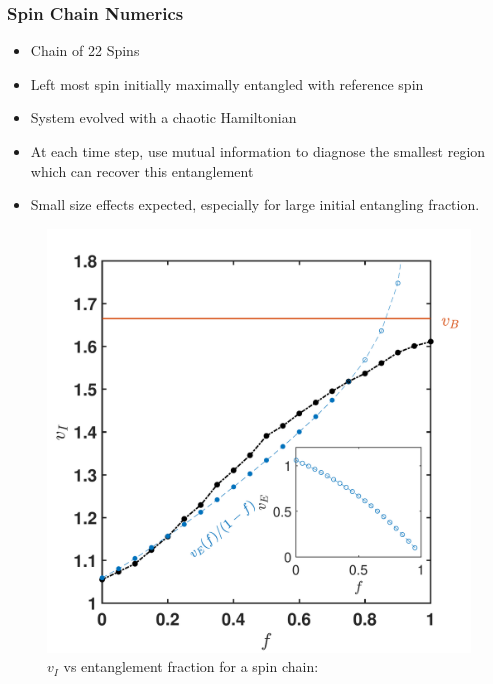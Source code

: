 \documentclass[10pt,aspectratio=169]{beamer}
\begin{document}
\begin{frame}
\frametitle{Spin Chain Numerics}

\begin{minipage}[t]{0.44\linewidth}

\begin{itemize}

\item Chain of 22 Spins

\item Left most spin initially maximally entangled with reference spin

\item System evolved with a chaotic Hamiltonian

\item At each time step, use mutual information to diagnose the smallest region which can recover this entanglement

\item Small size effects expected, especially for large initial entangling fraction.

\end{itemize}

\end{minipage}\hfill
%
\begin{minipage}[t]{0.55\linewidth}

\begin{figure}
    \begin{center}
    
        \includegraphics[scale=0.3]{speeds}    
    
    \end{center}
    \caption{$v_I$ vs entanglement fraction for a spin chain:}
    \label{fig:SpinChain}
\end{figure}

\end{minipage}

\end{frame}
\end{document}
